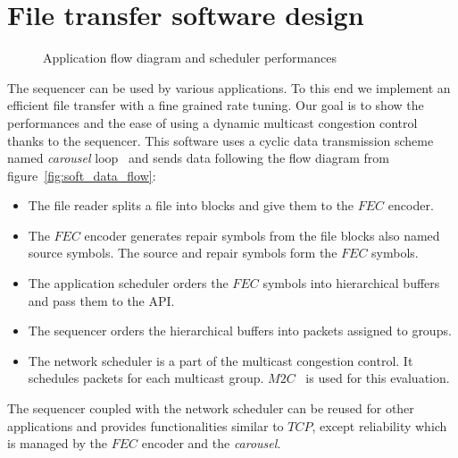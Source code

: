 \documentclass[a4paper]{article}
\begin{document}
\section{File transfer software design}
    \begin{figure}
        \centering
        \caption{Application flow diagram and scheduler performances}
    \end{figure}
    The sequencer can be used by various applications. To this end we implement
    an efficient file transfer with a fine grained rate tuning. Our goal is to
    show the performances and the ease of using a dynamic multicast congestion
    control thanks to the sequencer. This software uses a cyclic data
    transmission scheme named \textit{carousel}
    loop~\cite{peltotalo_performance_2007} and sends data following the flow
    diagram from figure~\ref{fig:soft_data_flow}:
    \begin{itemize}
        \item{
            The file reader splits a file into blocks and give them to the $FEC$
                encoder.
        }
        \item{
            The $FEC$ encoder generates repair symbols from the file blocks also
                named source symbols. The source and repair symbols form
                the $FEC$ symbols.
        }
        \item{
            The application scheduler orders the $FEC$ symbols into hierarchical
                buffers and pass them to the API.
        }
        \item{
            The sequencer orders the hierarchical buffers into packets assigned
                to groups.
        }
        \item{
            The network scheduler is a part of the multicast congestion control.
                It schedules packets for each multicast group.
                $M2C$~\cite{lucas_fair_2009} is used for this evaluation.
        }
    \end{itemize}
    The sequencer coupled with the network scheduler can be reused for other
    applications and provides functionalities similar to $TCP$, except
    reliability which is managed by the $FEC$ encoder and the \textit{carousel}.
\end{document}
